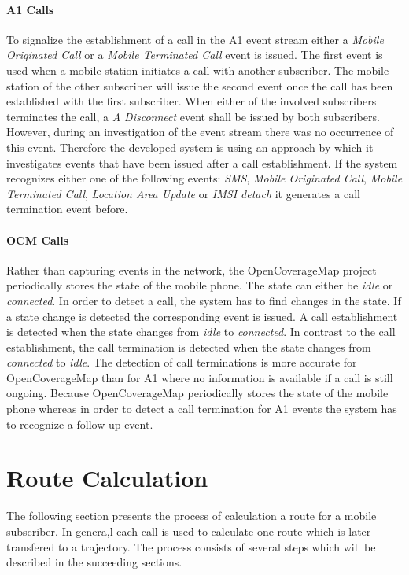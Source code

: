 \documentclass[master,english]{hgbthesis}
\begin{document}
\paragraph{A1 Calls}
To signalize the establishment of a call in the A1 event stream either a \emph{Mobile Originated Call} or a \emph{Mobile Terminated Call} event is issued. The first event is used when a mobile station initiates a call with another subscriber. The mobile station of the other subscriber will issue the second event once the call has been established with the first subscriber.
When either of the involved subscribers terminates the call, a \emph{A Disconnect} event shall be issued by both subscribers. However, during an investigation of the event stream there was no occurrence of this event. Therefore the developed system is using an approach by which it investigates events that have been issued after a call establishment. If the system recognizes either one of the following events: \emph{SMS}, \emph{Mobile Originated Call}, \emph{Mobile Terminated Call}, \emph{Location Area Update} or \emph{IMSI detach} it generates a call termination event before.
\paragraph{OCM Calls}
Rather than capturing events in the network, the OpenCoverageMap project periodically stores the state of the mobile phone. The state can either be \emph{idle} or \emph{connected}. In order to detect a call, the system has to find changes in the state. If a state change is detected the corresponding event is issued. A call establishment is detected when the state changes from \emph{idle} to \emph{connected}. In contrast to the call establishment, the call termination is detected when the state changes from \emph{connected} to \emph{idle}.
The detection of call terminations is more accurate for OpenCoverageMap than for A1 where no information is available if a call is still ongoing. Because OpenCoverageMap periodically stores the state of the mobile phone whereas in order to detect a call termination for A1 events the system has to recognize a follow-up event.
\section{Route Calculation}
The following section presents the process of calculation a route for a mobile subscriber. In genera,l each call is used to calculate one route which is later transfered to a trajectory. The process consists of several steps which will be described in the succeeding sections.
\end{document}

